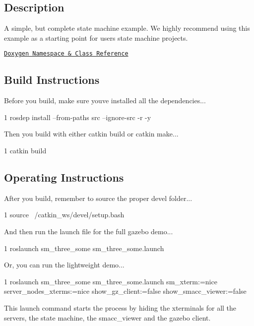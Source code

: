 \subsection*{Description}

A simple, but complete state machine example. We highly recommend using this example as a starting point for users state machine projects.~\newline


\href{https://reelrbtx.github.io/SMACC_Documentation/master/html/namespacesm__three__some.html}{\tt Doxygen Namespace \& Class Reference}

\subsection*{Build Instructions}

Before you build, make sure you\textquotesingle{}ve installed all the dependencies...


\begin{DoxyCode}
1 rosdep install --from-paths src --ignore-src -r -y 
\end{DoxyCode}


Then you build with either catkin build or catkin make...


\begin{DoxyCode}
1 catkin build
\end{DoxyCode}


\subsection*{Operating Instructions}

After you build, remember to source the proper devel folder...


\begin{DoxyCode}
1 source ~/catkin\_ws/devel/setup.bash
\end{DoxyCode}


And then run the launch file for the full gazebo demo...


\begin{DoxyCode}
1 roslaunch sm\_three\_some sm\_three\_some.launch
\end{DoxyCode}


Or, you can run the lightweight demo...


\begin{DoxyCode}
1 roslaunch sm\_three\_some sm\_three\_some.launch sm\_xterm:=nice server\_nodes\_xterms:=nice show\_gz\_client:=false
       show\_smacc\_viewer:=false
\end{DoxyCode}


This launch command starts the process by hiding the xterminals for all the servers, the state machine, the smacc\+\_\+viewer and the gazebo client. 